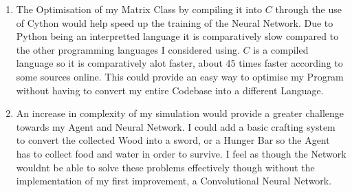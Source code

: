 \begin{flushleft}
\begin{enumerate}
            \vspace{0.2cm}
            \item The Optimisation of my Matrix Class by compiling it into $C$ through the use of Cython would help speed up the training of the Neural
            Network. Due to Python being an interpretted language it is comparatively slow compared to the other programming languages I considered
            using. $C$ is a compiled language so it is comparatively alot faster, about 45 times faster according to some sources online. This could
            provide an easy way to optimise my Program without having to convert my entire Codebase into a different Language. \\

            \vspace{0.2cm}
            \item An increase in complexity of my simulation would provide a greater challenge towards my Agent and Neural Network. I could add a basic
            crafting system to convert the collected Wood into a sword, or a Hunger Bar so the Agent has to collect food and water in order to survive.
            I feel as though the Network wouldnt be able to solve these problems effectively though without the implementation of my first improvement,
            a Convolutional Neural Network. \\

            \vspace{0.2cm}
        \end{enumerate}
        \vspace{0.5cm}
\end{flushleft}